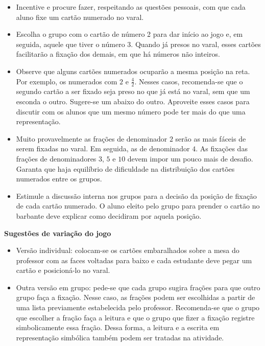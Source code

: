 \begin{orientacoes}{}{}
\begin{itemize}
  \item Incentive e procure fazer, respeitando as questões pessoais, com que cada aluno fixe um cartão numerado no varal. 
  \item Escolha o grupo com o cartão de número 2  para dar início ao jogo e, em seguida, aquele que tiver o número 3.  Quando já presos no varal, esses cartões facilitarão a fixação dos demais, em que há números não inteiros.
  \item Observe que alguns cartões numerados ocuparão a mesma posição na reta. Por exemplo, os numerados com $2$ e $\frac{4}{2}$. Nesses casos, recomenda-se que o segundo cartão a ser fixado seja preso no que já está no varal, sem que um esconda o outro. Sugere-se um abaixo do outro. Aproveite esses casos para discutir com os alunos que um mesmo número pode ter mais do que uma representação.
  \item Muito provavelmente as frações de denominador $2$ serão as mais fáceis de serem fixadas no varal. Em seguida, as de denominador $4$. As fixações das frações de denominadores $3$, $5$ e $10$ devem impor um pouco mais de desafio. Garanta que haja equilíbrio de dificuldade na distribuição dos cartões numerados entre os grupos.
  \item Estimule a discussão interna nos grupos para a decisão da posição de fixação de cada cartão numerado. O aluno eleito pelo grupo para prender o cartão no barbante deve explicar como decidiram por aquela posição.
  \end{itemize}

    \textbf{Sugestões de variação do jogo}\newline

\begin{itemize}  
  \item Versão individual: colocam-se os cartões embaralhados sobre a mesa do professor com as faces voltadas para baixo e cada estudante deve pegar um cartão e posicioná-lo no varal.
  \item Outra versão em grupo: pede-se que cada grupo sugira frações para que outro grupo faça a fixação. Nesse caso, as frações podem ser escolhidas a partir de uma lista previamente estabelecida pelo professor. Recomenda-se que o grupo que escolher a fração faça a leitura e que o grupo que fizer a fixação registre simbolicamente essa fração. Dessa forma, a leitura e a escrita em representação simbólica também podem ser tratadas na atividade.
\end{itemize} %
\end{orientacoes}

